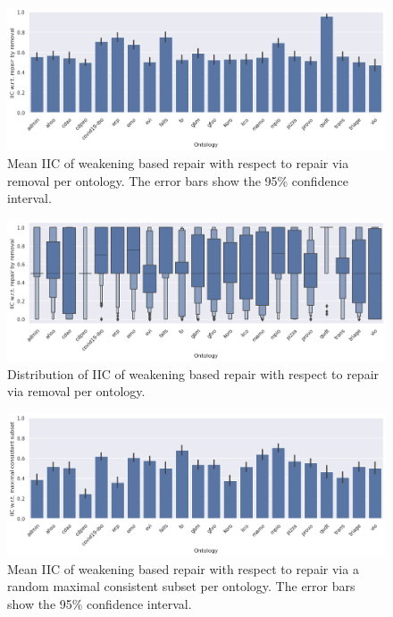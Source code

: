 
\begin{figure}[ht]
  \centering
  \includegraphics[width=\textwidth]{resources/iic-remove-ontology-bar.png}
  \caption{Mean IIC of weakening based repair with respect to repair via removal per ontology. The error bars show the 95\% confidence interval.}
\end{figure}

\begin{figure}[ht]
  \centering
  \includegraphics[width=\textwidth]{resources/iic-remove-ontology-violin.png}
  \caption{Distribution of IIC of weakening based repair with respect to repair via removal per ontology.}
\end{figure}

\begin{figure}[ht]
  \centering
  \includegraphics[width=\textwidth]{resources/iic-mcs-ontology-bar.png}
  \caption{Mean IIC of weakening based repair with respect to repair via a random maximal consistent subset per ontology. The error bars show the 95\% confidence interval.}
\end{figure}

